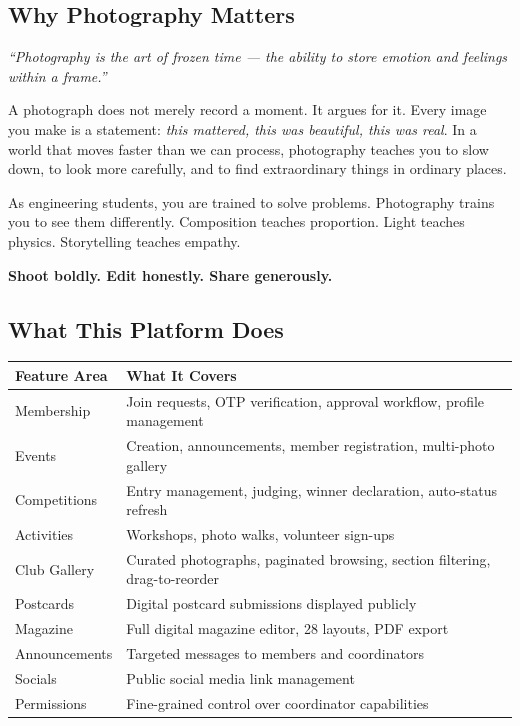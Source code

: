 \documentclass[12pt,a4paper]{article}
\begin{document}
\subsection{Why Photography Matters}

\begin{mdframed}[linecolor=ClubRed,linewidth=1.5pt,leftmargin=0pt,rightmargin=0pt,
  innerleftmargin=14pt,innerrightmargin=14pt,innertopmargin=12pt,innerbottommargin=12pt,
  backgroundcolor=BoxBg]
\itshape
``Photography is the art of frozen time --- the ability to store emotion and feelings within a frame.''

\smallskip
A photograph does not merely record a moment. It argues for it. Every image you make is a statement: \textit{this mattered, this was beautiful, this was real}. In a world that moves faster than we can process, photography teaches you to slow down, to look more carefully, and to find extraordinary things in ordinary places.

\smallskip
As engineering students, you are trained to solve problems. Photography trains you to see them differently. Composition teaches proportion. Light teaches physics. Storytelling teaches empathy.

\smallskip
\textbf{Shoot boldly. Edit honestly. Share generously.}
\end{mdframed}

\subsection{What This Platform Does}

\begin{center}
\renewcommand{\arraystretch}{1.35}
\begin{tabularx}{\linewidth}{L{3.8cm} X}
\toprule
\textbf{Feature Area} & \textbf{What It Covers} \\
\midrule
Membership & Join requests, OTP verification, approval workflow, profile management \\
Events & Creation, announcements, member registration, multi-photo gallery \\
Competitions & Entry management, judging, winner declaration, auto-status refresh \\
Activities & Workshops, photo walks, volunteer sign-ups \\
Club Gallery & Curated photographs, paginated browsing, section filtering, drag-to-reorder \\
Postcards & Digital postcard submissions displayed publicly \\
Magazine & Full digital magazine editor, 28 layouts, PDF export \\
Announcements & Targeted messages to members and coordinators \\
Socials & Public social media link management \\
Permissions & Fine-grained control over coordinator capabilities \\
\bottomrule
\end{tabularx}
\end{center}
\end{document}
